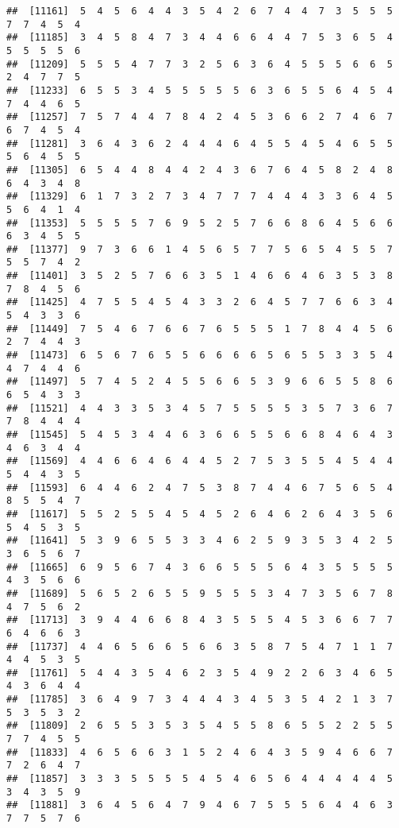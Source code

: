 \documentclass[
]{book}
\begin{document}
\begin{verbatim}
##  [11161]  5  4  5  6  4  4  3  5  4  2  6  7  4  4  7  3  5  5  5  7  7  4  5  4
##  [11185]  3  4  5  8  4  7  3  4  4  6  6  4  4  7  5  3  6  5  4  5  5  5  5  6
##  [11209]  5  5  5  4  7  7  3  2  5  6  3  6  4  5  5  5  6  6  5  2  4  7  7  5
##  [11233]  6  5  5  3  4  5  5  5  5  5  6  3  6  5  5  6  4  5  4  7  4  4  6  5
##  [11257]  7  5  7  4  4  7  8  4  2  4  5  3  6  6  2  7  4  6  7  6  7  4  5  4
##  [11281]  3  6  4  3  6  2  4  4  4  6  4  5  5  4  5  4  6  5  5  5  6  4  5  5
##  [11305]  6  5  4  4  8  4  4  2  4  3  6  7  6  4  5  8  2  4  8  6  4  3  4  8
##  [11329]  6  1  7  3  2  7  3  4  7  7  7  4  4  4  3  3  6  4  5  5  6  4  1  4
##  [11353]  5  5  5  5  7  6  9  5  2  5  7  6  6  8  6  4  5  6  6  6  3  4  5  5
##  [11377]  9  7  3  6  6  1  4  5  6  5  7  7  5  6  5  4  5  5  7  5  5  7  4  2
##  [11401]  3  5  2  5  7  6  6  3  5  1  4  6  6  4  6  3  5  3  8  7  8  4  5  6
##  [11425]  4  7  5  5  4  5  4  3  3  2  6  4  5  7  7  6  6  3  4  5  4  3  3  6
##  [11449]  7  5  4  6  7  6  6  7  6  5  5  5  1  7  8  4  4  5  6  2  7  4  4  3
##  [11473]  6  5  6  7  6  5  5  6  6  6  6  5  6  5  5  3  3  5  4  4  7  4  4  6
##  [11497]  5  7  4  5  2  4  5  5  6  6  5  3  9  6  6  5  5  8  6  6  5  4  3  3
##  [11521]  4  4  3  3  5  3  4  5  7  5  5  5  5  3  5  7  3  6  7  7  8  4  4  4
##  [11545]  5  4  5  3  4  4  6  3  6  6  5  5  6  6  8  4  6  4  3  4  6  3  4  4
##  [11569]  4  4  6  6  4  6  4  4  5  2  7  5  3  5  5  4  5  4  4  5  4  4  3  5
##  [11593]  6  4  4  6  2  4  7  5  3  8  7  4  4  6  7  5  6  5  4  8  5  5  4  7
##  [11617]  5  5  2  5  5  4  5  4  5  2  6  4  6  2  6  4  3  5  6  5  4  5  3  5
##  [11641]  5  3  9  6  5  5  3  3  4  6  2  5  9  3  5  3  4  2  5  3  6  5  6  7
##  [11665]  6  9  5  6  7  4  3  6  6  5  5  5  6  4  3  5  5  5  5  4  3  5  6  6
##  [11689]  5  6  5  2  6  5  5  9  5  5  5  3  4  7  3  5  6  7  8  4  7  5  6  2
##  [11713]  3  9  4  4  6  6  8  4  3  5  5  5  4  5  3  6  6  7  7  6  4  6  6  3
##  [11737]  4  4  6  5  6  6  5  6  6  3  5  8  7  5  4  7  1  1  7  4  4  5  3  5
##  [11761]  5  4  4  3  5  4  6  2  3  5  4  9  2  2  6  3  4  6  5  4  3  6  4  4
##  [11785]  3  6  4  9  7  3  4  4  4  3  4  5  3  5  4  2  1  3  7  5  3  5  3  2
##  [11809]  2  6  5  5  3  5  3  5  4  5  5  8  6  5  5  2  2  5  5  7  7  4  5  5
##  [11833]  4  6  5  6  6  3  1  5  2  4  6  4  3  5  9  4  6  6  7  7  2  6  4  7
##  [11857]  3  3  3  5  5  5  5  4  5  4  6  5  6  4  4  4  4  4  5  3  4  3  5  9
##  [11881]  3  6  4  5  6  4  7  9  4  6  7  5  5  5  6  4  4  6  3  7  7  5  7  6

\end{verbatim}
\end{document}
